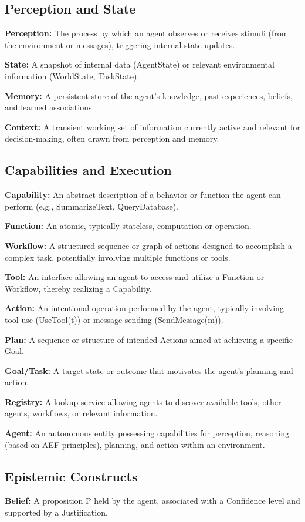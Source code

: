 \documentclass[10pt,a4paper]{article}
\begin{document}
\subsection{Perception and State}
\textbf{Perception:} The process by which an agent observes or receives stimuli (from the environment or messages), triggering internal state updates.

\textbf{State:} A snapshot of internal data (AgentState) or relevant environmental information (WorldState, TaskState).

\textbf{Memory:} A persistent store of the agent's knowledge, past experiences, beliefs, and learned associations.

\textbf{Context:} A transient working set of information currently active and relevant for decision-making, often drawn from perception and memory.

\subsection{Capabilities and Execution}
\textbf{Capability:} An abstract description of a behavior or function the agent can perform (e.g., SummarizeText, QueryDatabase).

\textbf{Function:} An atomic, typically stateless, computation or operation.

\textbf{Workflow:} A structured sequence or graph of actions designed to accomplish a complex task, potentially involving multiple functions or tools.

\textbf{Tool:} An interface allowing an agent to access and utilize a Function or Workflow, thereby realizing a Capability.

\textbf{Action:} An intentional operation performed by the agent, typically involving tool use (UseTool(t)) or message sending (SendMessage(m)).

\textbf{Plan:} A sequence or structure of intended Actions aimed at achieving a specific Goal.

\textbf{Goal/Task:} A target state or outcome that motivates the agent's planning and action.

\textbf{Registry:} A lookup service allowing agents to discover available tools, other agents, workflows, or relevant information.

\textbf{Agent:} An autonomous entity possessing capabilities for perception, reasoning (based on AEF principles), planning, and action within an environment.

\subsection{Epistemic Constructs}
\textbf{Belief:} A proposition P held by the agent, associated with a Confidence level and supported by a Justification.
\end{document}
